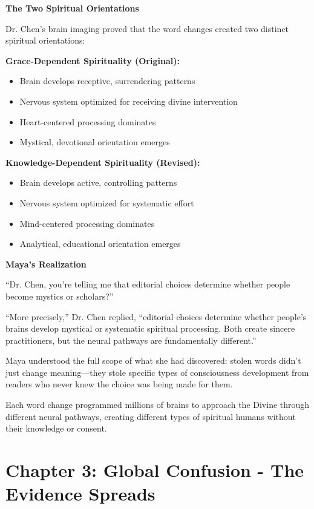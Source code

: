 \documentclass[11pt,twoside]{book}
\begin{document}
\textbf{The Two Spiritual Orientations}

Dr. Chen's brain imaging proved that the word changes created two distinct spiritual orientations:

\textbf{Grace-Dependent Spirituality (Original):}
\begin{itemize}
\item Brain develops receptive, surrendering patterns
\item Nervous system optimized for receiving divine intervention
\item Heart-centered processing dominates
\item Mystical, devotional orientation emerges
\end{itemize}

\textbf{Knowledge-Dependent Spirituality (Revised):}
\begin{itemize}
\item Brain develops active, controlling patterns
\item Nervous system optimized for systematic effort
\item Mind-centered processing dominates
\item Analytical, educational orientation emerges
\end{itemize}

\textbf{Maya's Realization}

``Dr. Chen, you're telling me that editorial choices determine whether people become mystics or scholars?''

``More precisely,'' Dr. Chen replied, ``editorial choices determine whether people's brains develop mystical or systematic spiritual processing. Both create sincere practitioners, but the neural pathways are fundamentally different.''

Maya understood the full scope of what she had discovered: stolen words didn't just change meaning—they stole specific types of consciousness development from readers who never knew the choice was being made for them.

Each word change programmed millions of brains to approach the Divine through different neural pathways, creating different types of spiritual humans without their knowledge or consent.

\chapter*{Chapter 3: Global Confusion - The Evidence Spreads}
\end{document}

